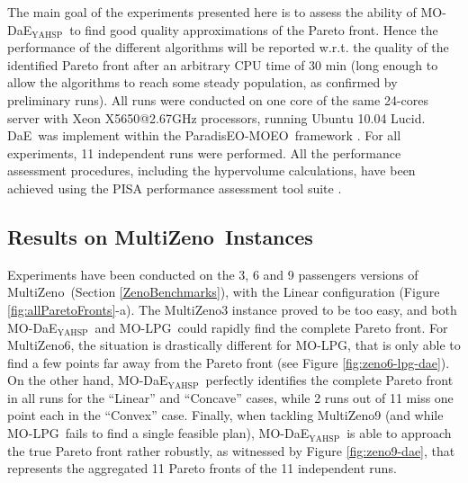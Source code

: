 \documentclass[letterpaper]{article}
\def\DAE{{\sc DaE}}
\def\PARADISEO{{\sc ParadisEO-MOEO}}
\newcommand{\MODAEYAHSP}{{\sc MO-DaE$_{\text{YAHSP}}$}}
\newcommand{\MOLPG}{{\sc MO-LPG}}
\def\MULTIZENO{{\sc MultiZeno}}
\begin{document}
The main goal of the experiments presented here is to assess the ability of \MODAEYAHSP\ to find good quality approximations of the Pareto front. Hence the performance of the different algorithms will be reported w.r.t. the quality of the identified Pareto front after an arbitrary CPU time of 30 min (long enough to allow the algorithms to reach some steady population, as confirmed by preliminary runs). All runs were conducted on one core of the same 24-cores server with Xeon X5650@2.67GHz processors, running Ubuntu 10.04 Lucid.
\DAE\ was implement within the \PARADISEO\ framework \cite{paradiseo}. For all experiments, 11 independent runs were performed. All the performance assessment procedures, including the hypervolume calculations, have been achieved using the PISA performance assessment tool suite \cite{Bleuler2003}. %


\subsection{Results on \MULTIZENO\ Instances}
\label{sec:resultsZENO}
Experiments have been conducted on the 3, 6 and 9 passengers versions of \MULTIZENO\ (Section \ref{ZenoBenchmarks}), with the Linear configuration (Figure \ref{fig:allParetoFronts}-a). The \MULTIZENO3 instance proved to be too easy, and both \MODAEYAHSP\ and \MOLPG\ could rapidly find the complete Pareto front. For \MULTIZENO6, the situation is drastically different for \MOLPG, that is only able to find a few points far away from the Pareto front (see Figure \ref{fig:zeno6-lpg-dae}). On the other hand, \MODAEYAHSP\ perfectly identifies the complete Pareto front in all runs for the ``Linear'' and ``Concave'' cases, while 2 runs out of 11 miss one point each in the ``Convex'' case. Finally, when tackling \MULTIZENO9 (and while \MOLPG\ fails to find a single feasible plan), \MODAEYAHSP\ is able to approach the true Pareto front rather robustly, as witnessed by Figure \ref{fig:zeno9-dae}, that represents the aggregated 11 Pareto fronts of the 11 independent runs.
\end{document}
